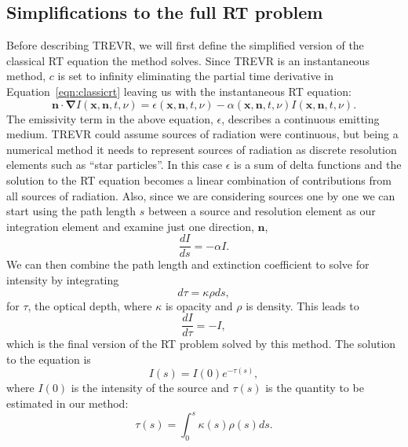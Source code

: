 \documentclass[fleq,usenatbib]{mnras}
\newcommand{\acro}{TREVR}
\begin{document}
{\subsection{Simplifications to the full RT problem}\label{sec:rteq}
Before describing \acro{}, we will first define the 
simplified version of the classical RT equation the method solves. Since 
\acro{} is an instantaneous method, $c$ is set to infinity eliminating the 
partial time derivative in Equation~\ref{eqn:classicrt} leaving us with the 
instantaneous RT equation:
\begin{equation} \label{infcrt}
\mathbf{n \cdot \nabla} I\left(\mathbf{x}, \mathbf{n}, t, 
\nu\right) = \epsilon\left(\mathbf{x}, \mathbf{n}, t, \nu\right) - 
\alpha\left(\mathbf{x}, \mathbf{n}, t, \nu\right) 
I\left(\mathbf{x}, \mathbf{n}, t, \nu\right).
\end{equation}
The emissivity term in the above equation, $\epsilon$, describes a continuous 
emitting medium. \acro{} could assume sources of radiation were continuous, but 
being a numerical method it needs to represent sources of radiation as 
discrete resolution elements such as ``star particles''. In this case $\epsilon$ is a sum of delta 
functions and the solution to the RT equation becomes a linear combination of 
contributions from all sources of radiation. Also, since we are considering 
sources one by one we can start using the path length $s$ between a source and 
resolution element as our integration element and examine just one direction, $\mathbf{n}$,
\begin{equation}
\label{eqn:combtransfer}
\frac{dI}{ds} = -\alpha I.
\end{equation}
We can then combine the path length and extinction coefficient to solve for 
intensity by integrating 
\begin{equation}
\label{eqn:dtau}
d\tau = \kappa \rho ds, 
\end{equation}
for $\tau$, the optical depth, where $\kappa$ is opacity and $\rho$ is 
density. This leads to
\begin{equation}
\label{eqn:absorbtransfer}
\frac{dI}{d\tau} = -I,
\end{equation}
which is the final version of the RT problem solved by this method. The 
solution to the equation is 
\begin{equation}
\label{eqn:ient}
I(s) = I(0)e^{-\tau(s)},
\end{equation}
where $I(0)$ is the intensity of the source and $\tau(s)$ is the
quantity to be estimated in our method:
\begin{equation}
\label{eqn:tauint}
\tau(s) = \int_{0}^s \kappa(s) \rho(s) ds.
\end{equation}

}
\end{document}
